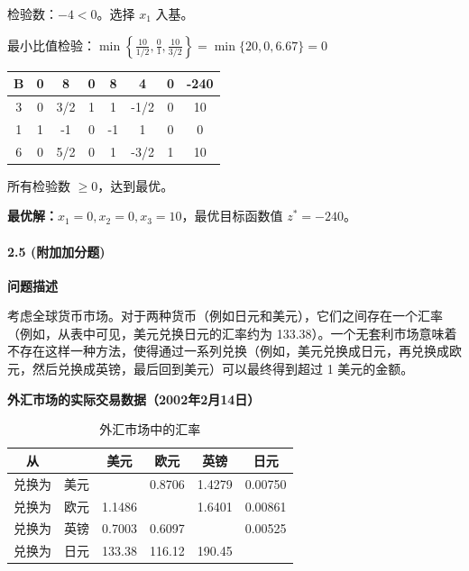 \documentclass[12pt,a4paper]{article}
\begin{document}
检验数：$-4 < 0$。选择 $x_1$ 入基。

最小比值检验：$\min\left\{\frac{10}{1/2}, \frac{0}{1}, \frac{10}{3/2}\right\} = \min\{20, 0, 6.67\} = 0$






\begin{table}[h]
\centering
\begin{tabular}{|c|cccccc|c|}
\hline
B & 0 & 8 & 0 & 8 & 4 & 0 & -240 \\
\hline
3 & 0 & 3/2 & 1 & 1 & -1/2 & 0 & 10 \\
1 & 1 & -1 & 0 & -1 & 1 & 0 & 0 \\
6 & 0 & 5/2 & 0 & 1 & -3/2 & 1 & 10 \\
\hline
\end{tabular}
\end{table}

所有检验数 $\geq 0$，达到最优。

\textbf{最优解：}$x_1 = 0, x_2 = 0, x_3 = 10$，最优目标函数值 $z^* = -240$。



\paragraph{2.5 (附加加分题)} 
\textbf{问题描述}

考虑全球货币市场。对于两种货币（例如日元和美元），它们之间存在一个汇率（例如，从表中可见，美元兑换日元的汇率约为 133.38）。一个无套利市场意味着不存在这样一种方法，使得通过一系列兑换（例如，美元兑换成日元，再兑换成欧元，然后兑换成英镑，最后回到美元）可以最终得到超过 1 美元的金额。

\textbf{外汇市场的实际交易数据（2002年2月14日）}

\begin{table}[ht]
	\caption{外汇市场中的汇率} 
	\centering 
	\begin{tabular}{c c c c c c} 
    \hline\hline
		从 & & 美元 & 欧元 & 英镑 & 日元\\ 
        \hline
		兑换为 & 美元 &        & 0.8706 & 1.4279 & 0.00750 \\ 
		兑换为 & 欧元 & 1.1486 &        & 1.6401 & 0.00861 \\
		兑换为 & 英镑 & 0.7003 & 0.6097 &        & 0.00525 \\
		兑换为 & 日元 & 133.38 & 116.12 & 190.45 &         \\ \hline\hline
	\end{tabular}
	\label{table:exchange} 
\end{table}
\end{document}
